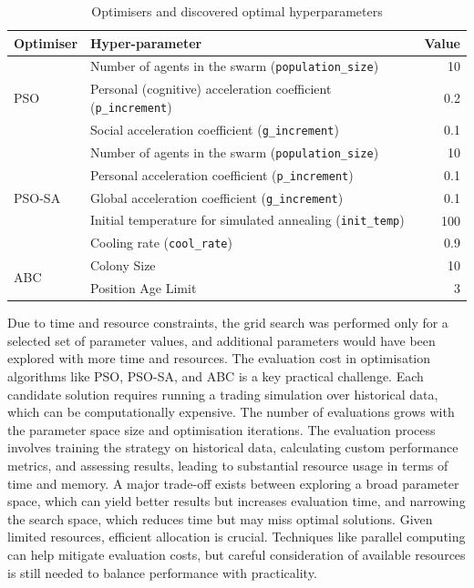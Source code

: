 \documentclass[a4paper, 12pt]{extarticle}
\begin{document}
\begin{table}[H]
    \centering
    \label{tab:optimizers}
    \begin{tabular}{llr}
      \toprule
      \textbf{Optimiser} & \textbf{Hyper-parameter}                          & \textbf{Value} \\ 
      \midrule
      \multirow{3}{*}{PSO}      
        & Number of agents in the swarm (\texttt{population\_size})       & 10   \\
        & Personal (cognitive) acceleration coefficient (\texttt{p\_increment}) & 0.2  \\
        & Social acceleration coefficient (\texttt{g\_increment})         & 0.1  \\
      \midrule
      \multirow{5}{*}{PSO-SA}   
        & Number of agents in the swarm (\texttt{population\_size})       & 10   \\
        & Personal acceleration coefficient (\texttt{p\_increment})      & 0.1  \\
        & Global acceleration coefficient (\texttt{g\_increment})        & 0.1  \\
        & Initial temperature for simulated annealing (\texttt{init\_temp}) & 100  \\
        & Cooling rate (\texttt{cool\_rate})                             & 0.9  \\
      \midrule
      \multirow{2}{*}{ABC}      
        & Colony Size                                                   & 10   \\
        & Position Age Limit                                            & 3    \\
      \bottomrule
    \end{tabular}
    \caption{Optimisers and discovered optimal hyperparameters}
\end{table}

Due to time and resource constraints, the grid search was performed only for a selected set of parameter values, and additional parameters would have been explored with more time and resources. The evaluation cost in optimisation algorithms like PSO, PSO-SA, and ABC is a key practical challenge. Each candidate solution requires running a trading simulation over historical data, which can be computationally expensive. The number of evaluations grows with the parameter space size and optimisation iterations. The evaluation process involves training the strategy on historical data, calculating custom performance metrics, and assessing results, leading to substantial resource usage in terms of time and memory. A major trade-off exists between exploring a broad parameter space, which can yield better results but increases evaluation time, and narrowing the search space, which reduces time but may miss optimal solutions. Given limited resources, efficient allocation is crucial. Techniques like parallel computing can help mitigate evaluation costs, but careful consideration of available resources is still needed to balance performance with practicality. 
\end{document}
